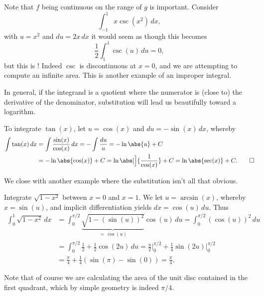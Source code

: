 \begin{remark}
	Note that $f$ being continuous on the range of $g$ is important.
	Consider
	\[
		\int_{-1}^1 x \csc(x^2) \, d x,
	\]
	with $u = x^2$ and $d u = 2 x \, d x$ it would seem as though this becomes
	\[
		\frac{1}{2} \int_1^1 \csc(u) \, d u = 0,
	\]
	but this is !
	Indeed $\csc$ is discontinuous at $x = 0$, and we are attempting to compute an infinite area.
	This is another example of an improper integral.
\end{remark}

\noindent
In general, if the integrand is a quotient where the numerator is (close to) the derivative of the denominator, substitution will lead us beautifully toward a logarithm.

\begin{example}
	To integrate $\tan(x)$, let $u = \cos(x)$ and $d u = - \sin(x) \, d x$, whereby
	\begin{align*}
		\int \tan(x) \, d x & = \int \frac{\sin(x)}{\cos(x)} \, d x = - \int \frac{d u}{u} = - \ln\abs{u} + C                  \\
		                    & = - \ln\abs{\cos(x)} + C = \ln\abs[\Big]{\frac{1}{\cos(x)}} + C = \ln\abs{\sec(x)} + C. \qedhere
	\end{align*}
\end{example}

\noindent
We close with another example where the substitution isn't all that obvious.

\begin{example}
	Integrate $\sqrt{1 - x^2}$ between $x = 0$ and $x = 1$.
	We let $u = \arcsin(x)$, whereby $x = \sin(u)$, and implicit differentiation yields $d x = \cos(u) \, d u$.
	Thus
	\begin{align*}
		\int_0^1 \sqrt{1 - x^2} \, d x & = \int_0^{\pi/2} \underbrace{\sqrt{1 - (\sin(u))^2}}_{=\, \cos(u)} \cos(u) \, d u = \int_0^{\pi/2} (\cos(u))^2 \, d u                         \\
		                               & = \int_0^{\pi/2} \frac{1}{2} + \frac{1}{2} \cos(2 u) \, d u = \frac{u}{2} \Big \rvert_0^{\pi/2} + \frac{1}{4} \sin(2 u) \Big \rvert_0^{\pi/2} \\
		                               & = \frac{\pi}{4} + \frac{1}{4} (\sin(\pi) - \sin(0)) = \frac{\pi}{4}.
	\end{align*}

	\noindent
	Note that of course we are calculating the area of the unit disc contained in the first quadrant, which by simple geometry is indeed $\pi / 4$.
\end{example}

